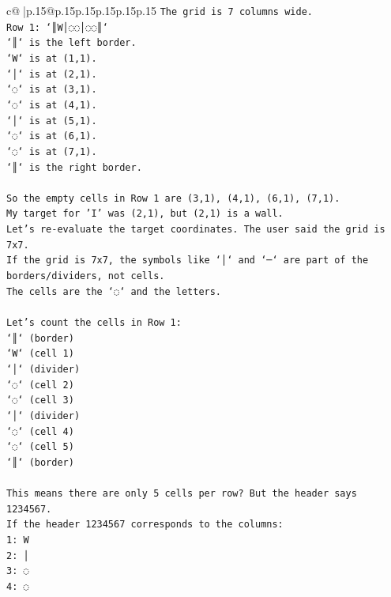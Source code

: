 \documentclass{article}
\begin{document}
{\begin{supertabular}{c@{$\;$}|p{.15\linewidth}@{}p{.15\linewidth}p{.15\linewidth}p{.15\linewidth}p{.15\linewidth}p{.15\linewidth}}
{{{\texttt{The grid is 7 columns wide.} \\
\texttt{Row 1: `║W│◌◌│◌◌║`} \\
\texttt{`║` is the left border.} \\
\texttt{`W` is at (1,1).} \\
\texttt{`│` is at (2,1).} \\
\texttt{`◌` is at (3,1).} \\
\texttt{`◌` is at (4,1).} \\
\texttt{`│` is at (5,1).} \\
\texttt{`◌` is at (6,1).} \\
\texttt{`◌` is at (7,1).} \\
\texttt{`║` is the right border.} \\
\\ 
\texttt{So the empty cells in Row 1 are (3,1), (4,1), (6,1), (7,1).} \\
\texttt{My target for 'I' was (2,1), but (2,1) is a wall.} \\
\texttt{Let's re{-}evaluate the target coordinates. The user said the grid is 7x7.} \\
\texttt{If the grid is 7x7, the symbols like `│` and `─` are part of the borders/dividers, not cells.} \\
\texttt{The cells are the `◌` and the letters.} \\
\\ 
\texttt{Let's count the cells in Row 1:} \\
\texttt{`║` (border)} \\
\texttt{`W` (cell 1)} \\
\texttt{`│` (divider)} \\
\texttt{`◌` (cell 2)} \\
\texttt{`◌` (cell 3)} \\
\texttt{`│` (divider)} \\
\texttt{`◌` (cell 4)} \\
\texttt{`◌` (cell 5)} \\
\texttt{`║` (border)} \\
\\ 
\texttt{This means there are only 5 cells per row? But the header says 1234567.} \\
\texttt{If the header 1234567 corresponds to the columns:} \\
\texttt{1: W} \\
\texttt{2: │} \\
\texttt{3: ◌} \\
\texttt{4: ◌} \\
}}}
\end{supertabular}}
\end{document}

